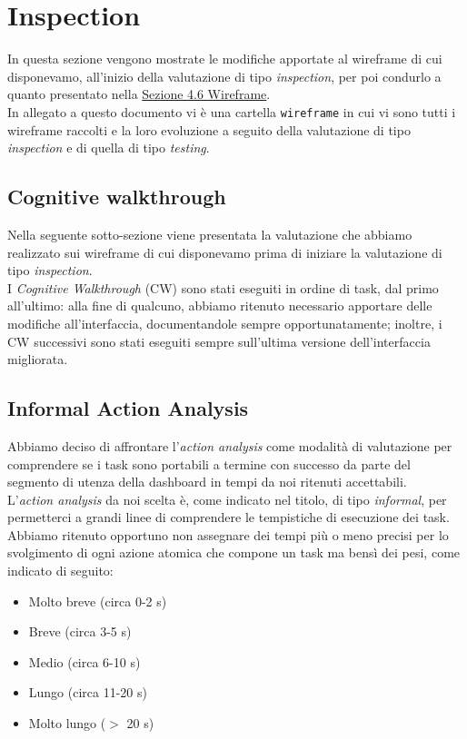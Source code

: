 \section{Inspection}
\label{s:inspection}

In questa sezione vengono mostrate le modifiche apportate al wireframe di cui disponevamo, all'inizio della valutazione di tipo \textit{inspection}, per poi condurlo a quanto presentato nella \hyperref[s:wireframe]{Sezione 4.6 Wireframe}.\\
In allegato a questo documento vi è una cartella \texttt{wireframe} in cui vi sono tutti i wireframe raccolti e la loro evoluzione a seguito della valutazione di tipo \textit{inspection} e di quella di tipo \textit{testing}.

\subsection{Cognitive walkthrough}
\label{ss:cognitive-walkthrough}

Nella seguente sotto-sezione viene presentata la valutazione che abbiamo realizzato sui wireframe di cui disponevamo prima di iniziare la valutazione di tipo \textit{inspection}.\\
I \textit{Cognitive Walkthrough} (CW) sono stati eseguiti in ordine di task, dal primo all'ultimo: alla fine di qualcuno, abbiamo ritenuto necessario apportare delle modifiche all'interfaccia, documentandole sempre opportunatamente; inoltre, i CW successivi sono stati eseguiti sempre sull'ultima versione dell'interfaccia migliorata.








\subsection{Informal Action Analysis}
\label{ss:informal-action-analysis}
Abbiamo deciso di affrontare l'\textit{action analysis} come modalità di valutazione per comprendere se i task sono portabili a termine con successo da parte del segmento di utenza della dashboard in tempi da noi ritenuti accettabili.\\
L'\textit{action analysis} da noi scelta è, come indicato nel titolo, di tipo \textit{informal}, per permetterci a grandi linee di comprendere le tempistiche di esecuzione dei task.\\
Abbiamo ritenuto opportuno non assegnare dei tempi più o meno precisi per lo svolgimento di ogni azione atomica che compone un task ma bensì dei pesi, come indicato di seguito:
\begin{itemize}
    \item Molto breve (circa 0-2 s)
    \item Breve (circa 3-5 s) 
    \item Medio (circa 6-10 s) 
    \item Lungo (circa 11-20 s) 
    \item Molto lungo ($>$ 20 s)
\end{itemize}

